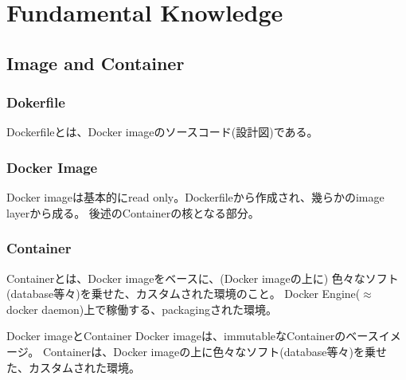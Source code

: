 \documentclass[10pt,a4j,openany,dvipdfmx]{jsarticle}
\begin{document}
\section{Fundamental Knowledge} %
\label{sec:fundamental_knowledge}

\subsection{Image and Container} %
\label{sub:image_and_container}

\subsubsection{Dokerfile} %
\label{ssub:dokerfile}


\begin{tcolorbox}[
title=Dockerfile, fonttitle=\bfseries]
Dockerfileとは、Docker imageのソースコード(設計図)である。
\end{tcolorbox}


\subsubsection{Docker Image} %
\label{ssub:docker_image}


\begin{tcolorbox}[
title=Docker Image, fonttitle=\bfseries]
Docker imageは基本的にread only。Dockerfileから作成され、幾らかのimage layerから成る。
後述のContainerの核となる部分。
\end{tcolorbox}


\subsubsection{Container} %
\label{ssub:container}


\begin{tcolorbox}[
title=Container, fonttitle=\bfseries]
Containerとは、Docker imageをベースに、(Docker imageの上に) 色々なソフト(database等々)を乗せた、カスタムされた環境のこと。
Docker Engine($\approx$ docker daemon)上で稼働する、packagingされた環境。
\end{tcolorbox}

\begin{skybox}{Docker imageとContainer}
Docker imageは、immutableなContainerのベースイメージ。
Containerは、Docker imageの上に色々なソフト(database等々)を乗せた、カスタムされた環境。
\end{skybox}
\end{document}
